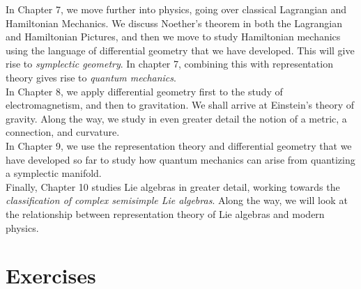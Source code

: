 	In Chapter 7, we move further into physics, going over classical Lagrangian and Hamiltonian Mechanics. We discuss Noether's theorem in both the Lagrangian and Hamiltonian Pictures, and then we move to study Hamiltonian mechanics using the language of differential geometry that we have developed. This will give rise to \emph{symplectic geometry}. In chapter 7, combining this with representation theory gives rise to \emph{quantum mechanics}.\\
	
	In Chapter 8, we apply differential geometry first to the study of electromagnetism, and then to gravitation. We shall arrive at Einstein's theory of gravity. Along the way, we study in even greater detail the notion of a metric, a connection, and curvature. \\
	
	In Chapter 9, we use the representation theory and differential geometry that we have developed so far to study how quantum mechanics can arise from quantizing a symplectic manifold.\\
	
	Finally, Chapter 10 studies Lie algebras in greater detail, working towards the \emph{classification of complex semisimple Lie algebras}. Along the way, we will look at the relationship between representation theory of Lie algebras and modern physics. 
	
	
	
	\section{Exercises} %
	\label{sec:exercises2}
	
	